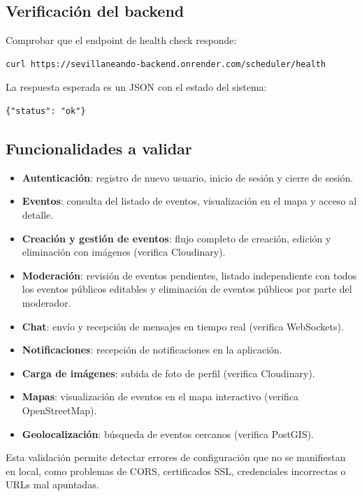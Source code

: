 \subsection{Verificación del backend}

Comprobar que el endpoint de health check responde:

\begin{lstlisting}
curl https://sevillaneando-backend.onrender.com/scheduler/health
\end{lstlisting}

La respuesta esperada es un JSON con el estado del sistema:

\begin{lstlisting}
{"status": "ok"}
\end{lstlisting}

\subsection{Funcionalidades a validar}

\begin{itemize}
    \item \textbf{Autenticación}: registro de nuevo usuario, inicio de sesión y cierre de sesión.
    \item \textbf{Eventos}: consulta del listado de eventos, visualización en el mapa y acceso al detalle.
    \item \textbf{Creación y gestión de eventos}: flujo completo de creación, edición y eliminación con imágenes (verifica Cloudinary).
    \item \textbf{Moderación}: revisión de eventos pendientes, listado independiente con todos los eventos públicos editables y eliminación de eventos públicos por parte del moderador.
    \item \textbf{Chat}: envío y recepción de mensajes en tiempo real (verifica WebSockets).
    \item \textbf{Notificaciones}: recepción de notificaciones en la aplicación.
    \item \textbf{Carga de imágenes}: subida de foto de perfil (verifica Cloudinary).
    \item \textbf{Mapas}: visualización de eventos en el mapa interactivo (verifica OpenStreetMap).
    \item \textbf{Geolocalización}: búsqueda de eventos cercanos (verifica PostGIS).
\end{itemize}

Esta validación permite detectar errores de configuración que no se manifiestan en local, como problemas de CORS, certificados SSL, credenciales incorrectas o URLs mal apuntadas.

